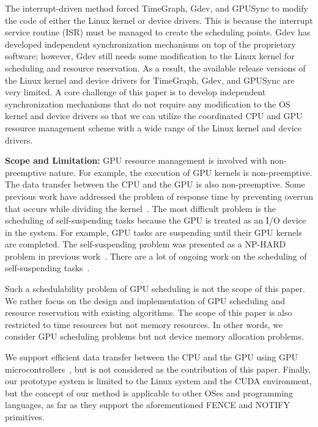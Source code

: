 The interrupt-driven method forced TimeGraph, Gdev, and GPUSync to
modify the code of either the Linux kernel or device drivers.
This is because the interrupt service routine (ISR) must be managed to
create the scheduling points.
Gdev has developed independent synchronization mechanisms on top of the
proprietary software; however, Gdev still needs some modification to the
Linux kernel for scheduling and resource reservation.
As a result, the available release versions of the Linux kernel and
device drivers for TimeGraph, Gdev, and GPUSync are very limited.
A core challenge of this paper is to develop independent synchronization
mechanisms that do not require any modification to the OS kernel and
device drivers so that we can utilize the coordinated CPU and GPU
resource management scheme with a wide range of the Linux kernel and
device drivers. 

\textbf{Scope and Limitation:}
GPU resource management is involved with non-preemptive nature.
For example, the execution of GPU kernels is non-preemptive.
The data transfer between the CPU and the GPU is also non-preemptive.
Some previous work have addressed the problem of response time by
preventing overrun that occurs while dividing the
kernel~\cite{basaran:preemptive,sparc}.
The most difficult problem is the scheduling of self-suspending tasks
because the GPU is treated as an I/O device in the system. 
For example, GPU tasks are suspending until their GPU kernels are
completed.
The self-suspending problem was presented as a NP-HARD problem in
previous work~\cite{self-sus:1,self-sus:2}.
There are a lot of ongoing work on the scheduling of self-suspending
tasks~\cite{chattopadhyay2014limited,kim2013segment}.

Such a schedulability problem of GPU scheduling is not the scope of this
paper.
We rather focus on the design and implementation of GPU scheduling and
resource reservation with existing algorithms.
The scope of this paper is also restricted to time resources but not
memory resources.
In other words, we consider GPU scheduling problems but not device
memory allocation problems.

We support efficient data transfer between the CPU and the GPU using
GPU microcontrollers~\cite{fujii:icpads2013}, but is not considered as
the contribution of this paper.
Finally, our prototype system is limited to the Linux system and the
CUDA environment, but the concept of our method is applicable to other
OSes and programming languages, as far as they support the
aforementioned FENCE and NOTIFY primitives.
